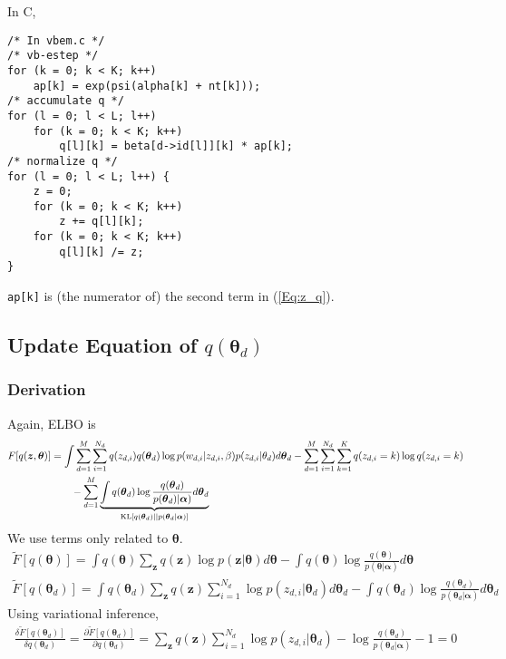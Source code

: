 \documentclass[a4paper,10.5pt,dvipdfmx]{jarticle}  %
\begin{document}
In C,
\begin{lstlisting}[style=C]
/* In vbem.c */
/* vb-estep */
for (k = 0; k < K; k++)
	ap[k] = exp(psi(alpha[k] + nt[k]));
/* accumulate q */
for (l = 0; l < L; l++)
	for (k = 0; k < K; k++)
		q[l][k] = beta[d->id[l]][k] * ap[k];
/* normalize q */
for (l = 0; l < L; l++) {
	z = 0;
	for (k = 0; k < K; k++)
		z += q[l][k];
	for (k = 0; k < K; k++)
		q[l][k] /= z;
}
\end{lstlisting}
\texttt{ap[k]} is (the numerator of) the second term in (\ref{Eq:z_q}).


\subsection{Update Equation of $q(\boldsymbol{\theta}_d)$}
\subsubsection{Derivation}
Again, ELBO is
\begin{align}
	F[q(\boldsymbol{z}, \boldsymbol{\theta})]  &= \int \sum_{d=1}^{M} \sum_{i=1}^{N_d} q(z_{d,i}) q(\boldsymbol{\theta}_d) \log p(w_{d,i} | z_{d,i}, \beta) p(z_{d,i} | \theta_{d}) d \boldsymbol{\theta}_d - \sum_{d=1}^{M} \sum_{i=1}^{N_d} \sum_{k=1}^{K} q(z_{d,i} = k) \log q(z_{d,i} = k) \\ &\qquad - \sum_{d=1}^{M} \underbrace{\int q(\boldsymbol{\theta}_d) \log \frac{q(\boldsymbol{\theta}_d)}{p(\boldsymbol{\theta}_d) | \boldsymbol{\alpha})} d \boldsymbol{\theta}_d}_{{\rm KL}\left[ q(\boldsymbol{\theta}_d) || p(\boldsymbol{\theta}_d | \boldsymbol{\alpha}) \right]} \nonumber
\end{align}
We use terms only related to $\boldsymbol{\theta}$.
\begin{align}
	\widetilde{F}[q(\boldsymbol{\theta})] = \int q(\boldsymbol{\theta}) \sum_{\boldsymbol{z}} q(\boldsymbol{z}) \log p(\boldsymbol{z} | \boldsymbol{\theta}) d \boldsymbol{\theta} - \int q(\boldsymbol{\theta}) \log \frac{q(\boldsymbol{\theta})}{p(\boldsymbol{\theta} | \boldsymbol{\alpha})} d \boldsymbol{\theta} \\
	\widetilde{F}[q(\boldsymbol{\theta}_d)] = \int q(\boldsymbol{\theta}_d) \sum_{\boldsymbol{z}} q(\boldsymbol{z}) \sum_{i=1}^{N_d} \log p(z_{d,i} | \boldsymbol{\theta}_d) d \boldsymbol{\theta}_d - \int q(\boldsymbol{\theta}_d) \log \frac{q(\boldsymbol{\theta}_d)}{p(\boldsymbol{\theta}_d | \boldsymbol{\alpha})} d \boldsymbol{\theta}_d
\end{align}
Using variational inference,
\begin{align}
	\frac{\delta \widetilde{F}[q(\boldsymbol{\theta}_d)]}{\delta q(\boldsymbol{\theta}_d)} = \frac{\partial \widetilde{F}[q(\boldsymbol{\theta}_d)]}{\partial q(\boldsymbol{\theta}_d)} = \sum_{\boldsymbol{z}} q(\boldsymbol{z}) \sum_{i=1}^{N_d} \log p(z_{d,i} | \boldsymbol{\theta}_d) - \log \frac{q(\boldsymbol{\theta}_d)}{p(\boldsymbol{\theta}_d | \boldsymbol{\alpha})} - 1 = 0
\end{align}
\end{document}
